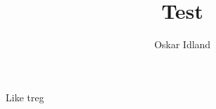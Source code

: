 \documentclass{article}
\author{Oskar Idland}
\title{Test}
\date{}
\begin{document}
\maketitle

Like treg 
\end{document}
